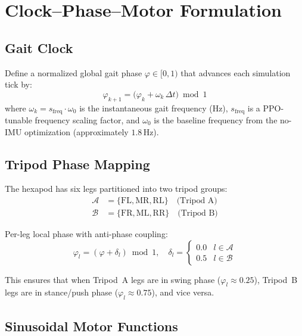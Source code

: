 \documentclass[11pt]{article}
\begin{document}
\section{Clock--Phase--Motor Formulation}
\label{sec:clock-phase-motor}

\subsection{Gait Clock}

Define a normalized global gait phase $\varphi\in[0,1)$ that advances each simulation tick by:
\begin{equation}
\varphi_{k+1} = \bigl(\varphi_k + \omega_k\,\Delta t\bigr) \bmod 1
\label{eq:clock}
\end{equation}
where $\omega_k = s_{\mathrm{freq}} \cdot \omega_0$ is the instantaneous gait frequency (Hz), $s_{\mathrm{freq}}$ is a PPO-tunable frequency scaling factor, and $\omega_0$ is the baseline frequency from the no-IMU optimization (approximately $1.8$\,Hz).

\subsection{Tripod Phase Mapping}

The hexapod has six legs partitioned into two tripod groups:
\begin{align}
\mathcal{A} &= \{\mathrm{FL}, \mathrm{MR}, \mathrm{RL}\} \quad\text{(Tripod A)} \\
\mathcal{B} &= \{\mathrm{FR}, \mathrm{ML}, \mathrm{RR}\} \quad\text{(Tripod B)}
\end{align}

Per-leg local phase with anti-phase coupling:
\begin{equation}
\varphi_l = (\varphi + \delta_l) \bmod 1, \quad
\delta_l =
\begin{cases}
0.0 & l \in \mathcal{A} \\
0.5 & l \in \mathcal{B}
\end{cases}
\label{eq:phase-map}
\end{equation}

This ensures that when Tripod~A legs are in swing phase ($\varphi_l \approx 0.25$), Tripod~B legs are in stance/push phase ($\varphi_l \approx 0.75$), and vice versa.

\subsection{Sinusoidal Motor Functions}
\end{document}
